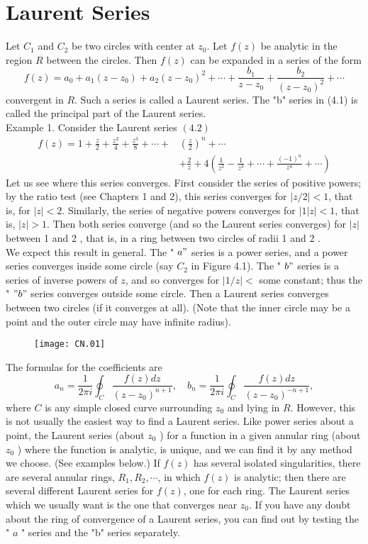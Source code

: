 \section{Laurent Series}
Let $C_{1}$ and $C_{2}$ be two circles with center at $z_{0}$. Let $f(z)$ be analytic in the region $R$ between the circles. Then $f(z)$ can be expanded in a series of the form
 $$f(z)=a_{0}+a_{1}\left(z-z_{0}\right)+a_{2}\left(z-z_{0}\right)^{2}+\cdots+\frac{b_{1}}{z-z_{0}}+\frac{b_{2}}{\left(z-z_{0}\right)^{2}}+\cdots$$
convergent in $R$. Such a series is called a Laurent series. The "b" series in (4.1) is called the principal part of the Laurent series.\\
Example 1. Consider the Laurent series
$(4.2)$
$$
\begin{aligned}
f(z)=1+\frac{z}{2}+\frac{z^{2}}{4}+\frac{z^{3}}{8}+\cdots+&\left(\frac{z}{2}\right)^{n}+\cdots \\
&+\frac{2}{z}+4\left(\frac{1}{z^{2}}-\frac{1}{z^{3}}+\cdots+\frac{(-1)^{n}}{z^{n}}+\cdots\right)
\end{aligned}
$$
Let us see where this series converges. First consider the series of positive powers; by the ratio test (see Chapters 1 and 2), this series converges for $|z / 2|<1$, that is, for $|z|<2$. Similarly, the series of negative powers converges for $|1| z \mid<1$, that is, $|z|>1$. Then both series converge (and so the Laurent series converges) for $|z|$ between 1 and 2 , that is, in a ring between two circles of radii 1 and 2 .\\
We expect this result in general. The " $a "$ series is a power series, and a power series converges inside some circle (say $C_{2}$ in Figure 4.1). The " $b "$ series is a series of inverse powers of $z$, and so converges for $|1 / z|<$ some constant; thus the " $" b "$ series converges outside some circle. Then a Laurent series converges between two circles (if it converges at all). (Note that the inner circle may be a point and the outer circle may have infinite radius).
\begin{figure}[H]
	\centering
	\texttt{[image: CN.01]}
\end{figure}
The formulas for the coefficients are 
$$
a_{n}=\frac{1}{2 \pi i} \oint_{C} \frac{f(z) d z}{\left(z-z_{0}\right)^{n+1}}, \quad b_{n}=\frac{1}{2 \pi i} \oint_{C} \frac{f(z) d z}{\left(z-z_{0}\right)^{-n+1}},
$$
where $C$ is any simple closed curve surrounding $z_{0}$ and lying in $R$. However, this is not usually the easiest way to find a Laurent series. Like power series about a point, the Laurent series (about $z_{0}$ ) for a function in a given annular ring (about $z_{0}$ ) where the function is analytic, is unique, and we can find it by any method we choose. (See examples below.) If $f(z)$ has several isolated singularities, there are several annular rings, $R_{1}, R_{2}, \cdots$, in which $f(z)$ is analytic; then there are several different Laurent series for $f(z)$, one for each ring. The Laurent series which we usually want is the one that converges near $z_{0}$. If you have any doubt about the ring of convergence of a Laurent series, you can find out by testing the " $a$ " series and the "b" series separately.\\
